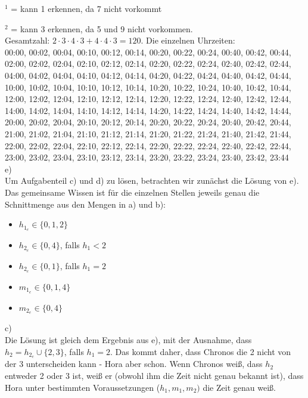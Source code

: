\documentclass{scrartcl}
\begin{document}
$^1$ = kann 1 erkennen, da 7 nicht vorkommt

$^2$ = kann 3 erkennen, da 5 und 9 nicht vorkommen. \\

Gesamtzahl: $2 \cdot 3 \cdot 4 \cdot 3 + 4 \cdot 4 \cdot 3 = 120.$ Die einzelnen Uhrzeiten: \\

00:00, 00:02, 00:04, 00:10, 00:12, 00:14, 00:20, 00:22, 00:24, 00:40, 00:42, 00:44, 02:00,
02:02, 02:04, 02:10, 02:12, 02:14, 02:20, 02:22, 02:24, 02:40, 02:42, 02:44, 04:00, 04:02,
04:04, 04:10, 04:12, 04:14, 04:20, 04:22, 04:24, 04:40, 04:42, 04:44, 10:00, 10:02, 10:04,
10:10, 10:12, 10:14, 10:20, 10:22, 10:24, 10:40, 10:42, 10:44, 12:00, 12:02, 12:04, 12:10,
12:12, 12:14, 12:20, 12:22, 12:24, 12:40, 12:42, 12:44, 14:00, 14:02, 14:04, 14:10, 14:12,
14:14, 14:20, 14:22, 14:24, 14:40, 14:42, 14:44, 20:00, 20:02, 20:04, 20:10, 20:12, 20:14,
20:20, 20:22, 20:24, 20:40, 20:42, 20:44, 21:00, 21:02, 21:04, 21:10, 21:12, 21:14, 21:20,
21:22, 21:24, 21:40, 21:42, 21:44, 22:00, 22:02, 22:04, 22:10, 22:12, 22:14, 22:20, 22:22,
22:24, 22:40, 22:42, 22:44, 23:00, 23:02, 23:04, 23:10, 23:12, 23:14, 23:20, 23:22, 23:24,
23:40, 23:42, 23:44 \\

e) \\

Um Aufgabenteil c) und d) zu lösen, betrachten wir zunächst die Lösung von e). Das gemeinsame
Wissen ist für die einzelnen Stellen jeweils genau die Schnittmenge aus den Mengen in a) und b):

\begin{itemize}
\item{$h_{1_e} \in \{0, 1, 2\}$}
\item{$h_{2_e} \in \{0, 4\}$, falls $h_1 < 2$}
\item{$h_{2_e} \in \{0, 1\}$, falls $h_1 = 2$}
\item{$m_{1_e} \in \{0, 1, 4\}$}
\item{$m_{2_e} \in \{0, 4\}$}
\end{itemize}

c) \\

Die Lösung ist gleich dem Ergebnis aus e), mit der Ausnahme, dass $h_2 = h_{2_e}
\cup \{2, 3\}$, falls $h_1 = 2$. Das kommt daher, dass Chronos die 2 nicht von der 3
unterscheiden kann - Hora aber schon. Wenn Chronos weiß, dass $h_2$ entweder 2 oder 3 ist,
weiß er (obwohl ihm die Zeit nicht genau bekannt ist), dass Hora unter bestimmten Voraussetzungen
($h_1, m_1, m_2)$ die Zeit genau weiß. \\
\end{document}

